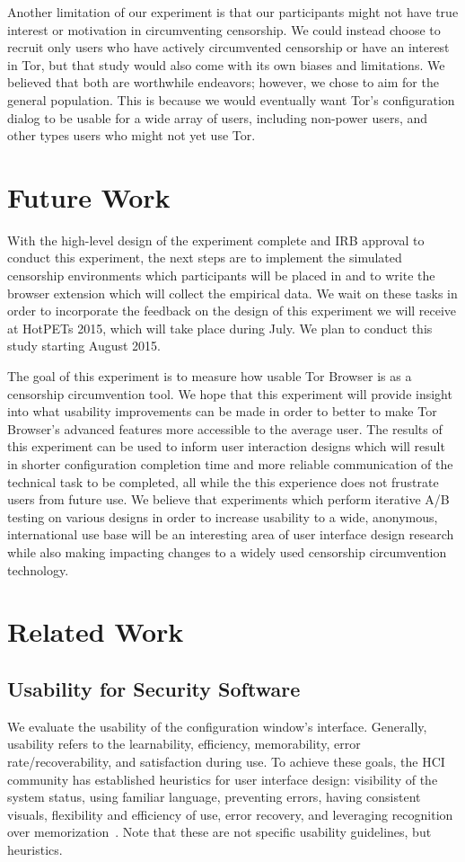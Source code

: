 \documentclass[letterpaper,twocolumn,11pt]{article}
\begin{document}
Another limitation of our experiment is that our participants might not have true interest or motivation in
circumventing censorship. We could instead choose to recruit only users who have actively circumvented
censorship or have an interest in Tor, but that study would also come with its own biases and limitations.
We believed that both are worthwhile endeavors; however, we chose to aim for the general population. 
This is because we would eventually want Tor's configuration dialog to be usable for a wide array of users, 
including non-power users, and other types users who might not yet use Tor. 

\section{Future Work}
\indent \indent With the high-level design of the experiment complete and IRB approval  to conduct this
experiment,  the next steps are to implement the simulated censorship environments which participants 
will be placed in and to write the browser extension which will collect the empirical data. 
We wait on these tasks in order to incorporate the feedback on the design of this experiment 
we will receive at HotPETs 2015, which will take place during July. We plan to conduct this study starting 
August 2015. 

The goal of this experiment is to measure how usable Tor Browser is as a censorship circumvention
tool. We hope that this experiment will provide insight into what usability improvements can be made 
in order to better to make Tor Browser's advanced features more accessible to the average user. The results
of this experiment can be used to inform user interaction designs which will result in shorter configuration
completion time and more reliable communication of the technical task to be completed, all while the 
this experience does not frustrate users from future use. We believe that experiments which perform
iterative A/B testing on various designs in order to increase usability to a wide, anonymous, international 
use base will be an interesting area of user interface design research while also making impacting changes
to a widely used censorship circumvention technology. 

\section{Related Work}

\subsection{Usability for Security Software}
\indent \indent 
We evaluate the usability of the configuration window's interface. Generally, usability 
refers to the learnability, efficiency, memorability, error rate/recoverability, and satisfaction
during use. To achieve these goals, the HCI community has established heuristics for user
interface design: visibility of the system status, using familiar
language, preventing errors, having consistent visuals, flexibility and efficiency of use, 
error recovery, and leveraging recognition over memorization~\cite{nielsen199510}. Note
that these are not specific usability guidelines, but heuristics. 
\end{document}
